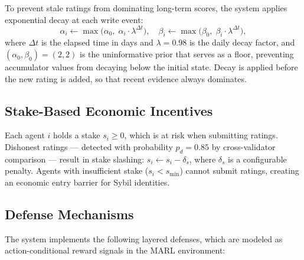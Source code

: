 To prevent stale ratings from dominating long-term scores, the system
applies exponential decay at each write event:
\begin{equation}
  \alpha_i \leftarrow \max\bigl(\alpha_0,\; \alpha_i \cdot \lambda^{\Delta t}\bigr), \quad
  \beta_i  \leftarrow \max\bigl(\beta_0,\; \beta_i  \cdot \lambda^{\Delta t}\bigr),
  \label{eq:decay}
\end{equation}
where $\Delta t$ is the elapsed time in days and $\lambda = 0.98$ is the
daily decay factor, and $(\alpha_0, \beta_0) = (2, 2)$ is the uninformative prior that serves as a floor, preventing accumulator values from decaying below the initial state.  Decay is applied before the new rating is added,
so that recent evidence always dominates.

\subsection{Stake-Based Economic Incentives}

Each agent $i$ holds a stake $s_i \geq 0$, which is at risk when submitting
ratings.  Dishonest ratings — detected with probability $p_d = 0.85$ by
cross-validator comparison — result in stake slashing: $s_i \leftarrow
s_i - \delta_s$, where $\delta_s$ is a configurable penalty.  Agents
with insufficient stake ($s_i < s_{\min}$) cannot submit ratings, creating
an economic entry barrier for Sybil identities.

\subsection{Defense Mechanisms}

The system implements the following layered defenses, which are modeled
as action-conditional reward signals in the MARL environment:

